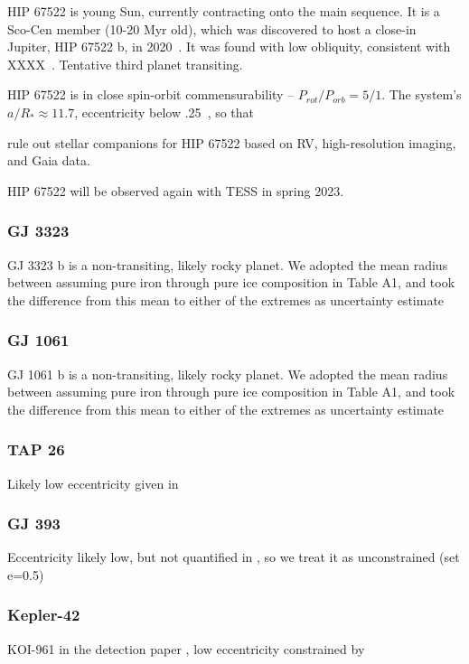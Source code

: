 \documentclass[twocolumn]{aastex631}
\begin{document}
HIP 67522 is young Sun, currently contracting onto the main sequence. It is a Sco-Cen member (10-20 Myr old), which was discovered to host a close-in Jupiter, HIP 67522 b, in 2020~\citep{rizzuto2020tess}. It was found with low obliquity, consistent with XXXX~\citep{heitzmann2021obliquity}. Tentative third planet transiting.

HIP 67522 is in close spin-orbit commensurability -- $P_{rot}/P_{orb}=5/1$. The system's $a/R_*\approx11.7$, eccentricity below .25~\cite{rizzuto2020tess}, so that  

\cite{wood2021characterizing} rule out stellar companions for HIP 67522 based on RV, high-resolution imaging, and Gaia data.

HIP 67522 will be observed again with TESS in spring 2023.
\subsubsection{GJ 3323}

GJ 3323 b is a non-transiting, likely rocky planet. We adopted the mean radius between assuming pure iron through pure ice composition in \cite{lovos2022null} Table A1, and took the difference from this mean to either of the extremes as uncertainty estimate

\subsubsection{GJ 1061}
GJ 1061 b is a non-transiting, likely rocky planet. We adopted the mean radius between assuming pure iron through pure ice composition in \cite{lovos2022null} Table A1, and took the difference from this mean to either of the extremes as uncertainty estimate

\subsubsection{TAP 26}
Likely low eccentricity given in \cite{yu2017hot}

\subsubsection{GJ 393}
Eccentricity likely low, but not quantified in \cite{amado2021carmenes}, so we treat it as unconstrained (set e=0.5)

\subsubsection{Kepler-42}
 	KOI-961 in the detection paper \cite{muirhead2012characterizing}, low eccentricity constrained by \cite{mann2017gold}
\end{document}
